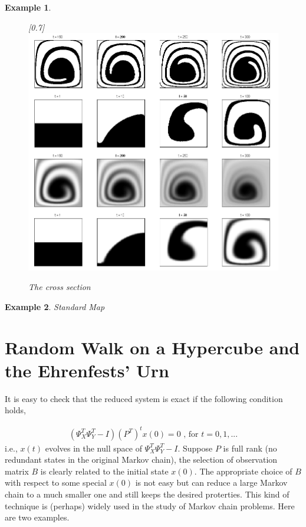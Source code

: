 \documentclass{article}
\newtheorem{example}{Example}
\begin{document}
\begin{example}
\begin{figure}
 \centerline{
  \scalebox{0.7}[0.7]{\includegraphics{mixingcrosssection.png}}}
  \caption{The cross section}
  \label{mixingcrosssection}
\end{figure}
  

\end{example}
\begin{example}
Standard Map
\end{example}


\section{Random Walk on a Hypercube and the Ehrenfests' Urn}

It is easy to check that the reduced system is exact if the following condition holds,

\begin{eqnarray}
 (\Psi_X^T\Psi_Y^T-I)(P^T)^t x(0) =0 \mbox{  , for }t=0,1,...
\end{eqnarray}
i.e., $x(t)$ evolves in the null space of $\Psi_X^T\Psi_Y^T-I$. Suppose $P$ is full rank (no redundant states in the original Markov chain), the selection of observation matrix $B$ is clearly related to the initial state $x(0)$. The appropriate choice of $B$ with respect to some special $x(0)$ is not easy but can reduce a large Markov chain to a much smaller one and still keeps the desired proterties. This kind of technique is (perhaps) widely used in the study of Markov chain problems. Here are two examples. 
\end{document}
